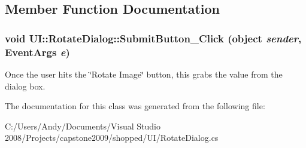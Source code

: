 \subsection{Member Function Documentation}
\hypertarget{class_u_i_1_1_rotate_dialog_ac7b57eb47857579ea2ee9be19d92c032}{
\subsubsection[{SubmitButton\_\-Click}]{\setlength{\rightskip}{0pt plus 5cm}void UI::RotateDialog::SubmitButton\_\-Click (object {\em sender}, \/  EventArgs {\em e})}}
\label{class_u_i_1_1_rotate_dialog_ac7b57eb47857579ea2ee9be19d92c032}
Once the user hits the \char`\"{}Rotate Image\char`\"{} button, this grabs the value from the dialog box. 

The documentation for this class was generated from the following file:\begin{DoxyCompactItemize}
\item 
C:/Users/Andy/Documents/Visual Studio 2008/Projects/capstone2009/shopped/UI/RotateDialog.cs\end{DoxyCompactItemize}
